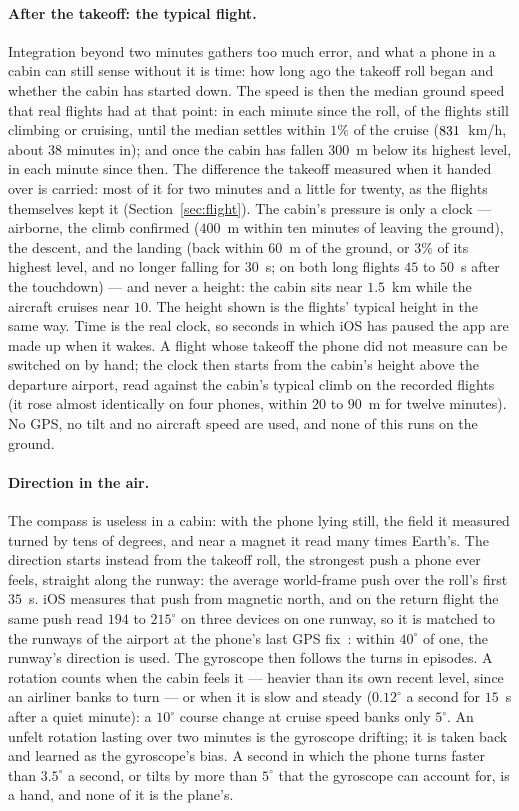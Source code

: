 \documentclass[11pt]{article}
\newcommand{\dg}{^\circ}
\begin{document}
\paragraph{After the takeoff: the typical flight.} Integration beyond two minutes gathers too much error,
and what a phone in a cabin can still sense without it is time: how long ago the takeoff roll began and
whether the cabin has started down. The speed is then the median ground speed that real flights had at
that point: in each minute since the roll, of the flights still climbing or cruising, until the median
settles within $1\%$ of the cruise ($831$~km/h, about $38$ minutes in); and once the cabin has fallen
$300$~m below its highest level, in each minute since then. The difference the takeoff measured when it
handed over is carried: most of it for two minutes and a little for twenty, as the flights themselves
kept it (Section~\ref{sec:flight}). The cabin's pressure is only a clock --- airborne, the climb confirmed
($400$~m within ten minutes of leaving the ground), the descent, and the landing (back within $60$~m of the
ground, or $3\%$ of its highest level, and no longer falling for $30$~s; on both long flights $45$ to $50$~s after
the touchdown) --- and never a height: the cabin sits near
$1.5$~km while the aircraft cruises near $10$. The height shown is the flights' typical height in the same
way. Time is the real clock, so seconds in which iOS has paused the app are made up when it wakes. A
flight whose takeoff the phone did not measure can be switched on by hand; the clock then starts from the
cabin's height above the departure airport, read against the cabin's typical climb on the recorded flights
(it rose almost identically on four phones, within $20$ to $90$~m for twelve minutes). No
GPS, no tilt and no aircraft speed are used, and none of this runs on the ground.

\paragraph{Direction in the air.} The compass is useless in a cabin: with the phone lying still, the
field it measured turned by tens of degrees, and near a magnet it read many times Earth's. The direction
starts instead from the takeoff roll, the strongest push a phone ever feels, straight along the runway:
the average world-frame push over the roll's first $35$~s. iOS measures that push from magnetic north, and
on the return flight the same push read $194$ to $215\dg$ on three devices on one runway, so it is matched to
the runways of the airport at the phone's last GPS fix~\cite{ourairports}: within $40\dg$ of one, the runway's
direction is used. The gyroscope then follows the turns in episodes. A rotation counts when the cabin feels
it --- heavier than its own recent level, since an airliner banks to turn --- or when it is slow and steady
($0.12\dg$ a second for $15$~s after a quiet minute): a $10\dg$ course change at cruise speed banks only $5\dg$.
An unfelt rotation lasting over two minutes is the gyroscope drifting; it is taken back and learned as the
gyroscope's bias. A second in which the phone turns faster than $3.5\dg$ a second, or tilts by more than
$5\dg$ that the gyroscope can account for, is a hand, and none of it is the plane's.
\end{document}
